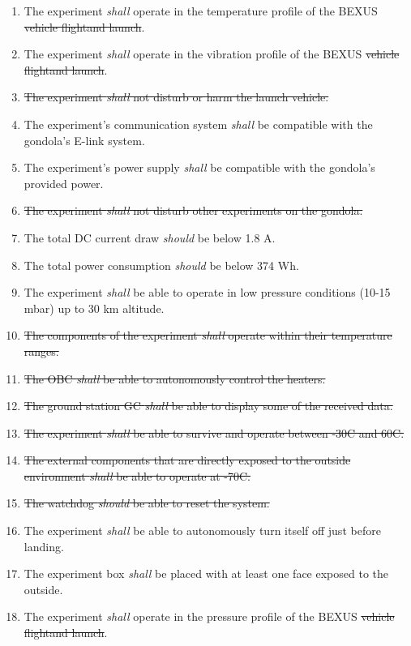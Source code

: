 \documentclass[a4paper,12pt,twoside]{article}
\providecommand{\DIFaddtex}[1]{{\protect\color{blue}\uwave{#1}}} %
\providecommand{\DIFdeltex}[1]{{\protect\color{red}\sout{#1}}}                      %
\providecommand{\DIFaddbegin}{} %
\providecommand{\DIFaddend}{} %
\providecommand{\DIFdelbegin}{} %
\providecommand{\DIFdelend}{} %
\providecommand{\DIFadd}[1]{\texorpdfstring{\DIFaddtex{#1}}{#1}} %
\providecommand{\DIFdel}[1]{\texorpdfstring{\DIFdeltex{#1}}{}} %
\newcommand{\DIFscaledelfig}{0.5}
\newlength{\DIFdelgraphicswidth} %
\newlength{\DIFdelgraphicsheight} %
\newcommand{\DIFaddincludegraphics}[2][]{{\color{blue}\fbox{\DIFOincludegraphics[#1]{#2}}}} %
\newcommand{\DIFdelincludegraphics}[2][]{%
\sbox{\DIFdelgraphicsbox}{\DIFOincludegraphics[#1]{#2}}%
\settoboxwidth{\DIFdelgraphicswidth}{\DIFdelgraphicsbox} %
\settoboxtotalheight{\DIFdelgraphicsheight}{\DIFdelgraphicsbox} %
\scalebox{\DIFscaledelfig}{%
\parbox[b]{\DIFdelgraphicswidth}{\usebox{\DIFdelgraphicsbox}\\[-\baselineskip] \rule{\DIFdelgraphicswidth}{0em}}\llap{\resizebox{\DIFdelgraphicswidth}{\DIFdelgraphicsheight}{%
\setlength{\unitlength}{\DIFdelgraphicswidth}%
\begin{picture}(1,1)%
\thicklines\linethickness{2pt} %
{\color[rgb]{1,0,0}\put(0,0){\framebox(1,1){}}}%
{\color[rgb]{1,0,0}\put(0,0){\line( 1,1){1}}}%
{\color[rgb]{1,0,0}\put(0,1){\line(1,-1){1}}}%
\end{picture}%
}\hspace*{3pt}}} %
} %
\DeclareRobustCommand{\DIFaddbegin}{\DIFOaddbegin \let\includegraphics\DIFaddincludegraphics} %
\DeclareRobustCommand{\DIFaddend}{\DIFOaddend \let\includegraphics\DIFOincludegraphics} %
\DeclareRobustCommand{\DIFdelbegin}{\DIFOdelbegin \let\includegraphics\DIFdelincludegraphics} %
\DeclareRobustCommand{\DIFdelend}{\DIFOaddend \let\includegraphics\DIFOincludegraphics} %
\begin{document}
\begin{enumerate}[label=D.\arabic*]
    \item The experiment \textit{shall} operate in the temperature profile of the BEXUS \DIFdelbegin \DIFdel{vehicle flightand launch}\DIFdelend \DIFaddbegin \DIFadd{flight}\DIFaddend .
    \item The experiment \textit{shall} operate in the vibration profile of the BEXUS \DIFdelbegin \DIFdel{vehicle flightand launch}\DIFdelend \DIFaddbegin \DIFadd{flight}\DIFaddend .
    \item \st{The experiment \textit{shall} not disturb or harm the launch vehicle.}
    \item The experiment's communication system \textit{shall} be compatible with the gondola's E-link system.
    \item The experiment's power supply \textit{shall} be compatible with the gondola's provided power.
    \item \st{The experiment \textit{shall} not disturb other experiments on the gondola.}
    \item The total DC current draw \textit{should} be below 1.8 A.
    \item The total power consumption \textit{should} be below 374 Wh.
    \item The experiment \textit{shall} be able to operate in low pressure conditions (10-15 mbar) up to 30 km altitude.
    \item \st{The components of the experiment \textit{shall} operate within their temperature ranges.}
    \item \st{The OBC \textit{shall} be able to autonomously control the heaters.}
    \item \st{The ground station GC \textit{shall} be able to display some of the received data.}
    \item \st{The experiment \textit{shall} be able to survive and operate between -30\degree C and 60\degree C.}
    \item \st{The external components that are directly exposed to the outside environment \textit{shall} be able to operate at -70\degree C.}
    \item \st{The watchdog \textit{should} be able to reset the system.}
    \item The experiment \textit{shall} be able to autonomously turn itself off just before landing.
    \item The experiment box \textit{shall} be placed with at least one face exposed to the outside.
    \item The experiment \textit{shall} operate in the pressure profile of the BEXUS \DIFdelbegin \DIFdel{vehicle flightand launch}\DIFdelend \DIFaddbegin \DIFadd{flight}\DIFaddend .

\end{enumerate}
\end{document}
